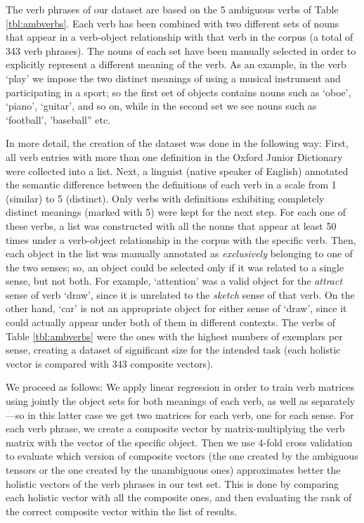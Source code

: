 \documentclass[11pt]{article}
\begin{document}
The verb phrases of our dataset are based on the 5 ambiguous verbs of Table \ref{tbl:ambverbs}. Each verb has been combined with two different sets of nouns that appear in a verb-object relationship with that verb in the corpus (a total of 343 verb phrases). The nouns of each set have been manually selected in order to explicitly represent a different meaning of the verb. As an example, in the verb `play' we impose the two distinct meanings of using a musical instrument and participating in a sport; so the first set of objects  contains nouns such as `oboe', `piano', `guitar', and so on, while in the second set we see nouns such as `football', 'baseball'' etc. 

In more detail, the creation of the dataset was done in the following way: First, all verb entries with more than one definition in the Oxford Junior Dictionary \cite{OxfordJun} were collected into a list. Next, a linguist (native speaker of English) annotated the semantic difference between the definitions of each verb in a scale from 1 (similar) to 5 (distinct). Only verbs with definitions exhibiting completely distinct meanings (marked with 5) were kept for the next step. For each one of these verbs, a list was constructed with all the nouns that appear at least 50 times under a verb-object relationship in the corpus with the specific verb. Then, each object in the list was manually annotated as \textit{exclusively} belonging to one of the two senses; so, an object could be selected only if it was related to a single sense, but not both. For example, `attention' was a valid object for the \textit{attract} sense of verb `draw', since it is unrelated to the \textit{sketch} sense of that verb. On the other hand, `car' is not an appropriate object for either sense of `draw', since it could actually appear under both of them in different contexts. The verbs of Table \ref{tbl:ambverbs} were the ones with the highest numbers of exemplars per sense, creating a dataset of significant size for the intended task (each holistic vector is compared with 343 composite vectors).

We proceed as follows: We apply linear regression in order to train verb matrices using jointly the object sets for both meanings of each verb, as well as separately---so in this latter case we get two matrices for each verb, one for each sense. For each verb phrase, we create a composite vector by matrix-multiplying the verb matrix with the vector of the specific object. Then we use 4-fold cross validation to evaluate which version of composite vectors (the one created by the ambiguous tensors or the one created by the unambiguous ones) approximates better the holistic vectors of the verb phrases in our test set. This is done by comparing each holistic vector with all the composite ones, and then evaluating the rank of the correct composite vector within the list of results. 
\end{document}
